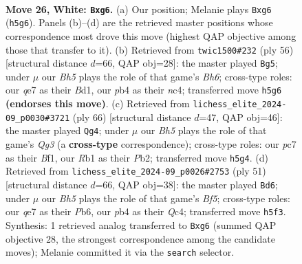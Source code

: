 \documentclass[11pt]{article}
\begin{document}
\clearpage

\begin{figure}[p]\centering
\begin{subfigure}{0.46\textwidth}\centering
\resizebox{\linewidth}{!}{%
\newchessgame
\chessboard[
  setfen={4r1k1/p1ppq2p/5pp1/6nB/1pPP4/P2Q4/2P2P1P/1R4K1 w - - 0 26},
  showmover=false,
  pgfstyle=straightmove, color=movearrow, markmove={h5-g6}
]}
\caption{}
\end{subfigure}\hfill
\begin{subfigure}{0.46\textwidth}\centering
\resizebox{\linewidth}{!}{%
\newchessgame
\chessboard[
  setfen={2rq2k1/5pbp/6pB/p2p4/P1n5/2P3QP/5PP1/3BR1K1 w - - 4 29},
  showmover=false,
  pgfstyle=straightmove, color=movearrow, markmove={h6-g5}
]}
\caption{}
\end{subfigure}
\\[4pt]
\begin{subfigure}{0.46\textwidth}\centering
\resizebox{\linewidth}{!}{%
\newchessgame
\chessboard[
  setfen={1k1r4/p3np2/P1pqp2p/1p4p1/7P/4R1Q1/1PP2PP1/5BK1 w - - 3 34},
  showmover=false,
  pgfstyle=straightmove, color=movearrow, markmove={g3-g4}
]}
\caption{}
\end{subfigure}\hfill
\begin{subfigure}{0.46\textwidth}\centering
\resizebox{\linewidth}{!}{%
\newchessgame
\chessboard[
  setfen={4r1k1/2p2pp1/1p5p/8/p1qP1b2/2P2NPP/P4P2/1R1Q2K1 b - - 0 26},
  showmover=false,
  pgfstyle=straightmove, color=movearrow, markmove={f4-d6}
]}
\caption{}
\end{subfigure}
\caption{\textbf{Move 26, White: \texttt{Bxg6}.} (a) Our position; Melanie plays \texttt{Bxg6} (\texttt{h5g6}). Panels (b)--(d) are the retrieved master positions whose correspondence most drove this move (highest QAP objective among those that transfer to it). (b) Retrieved from \texttt{twic1500\#232} (ply 56) [structural distance $d$=66, QAP obj=28]: the master played \texttt{Bg5}; under $\mu$ our \emph{Bh5} plays the role of that game's \emph{Bh6}; cross-type roles: our \emph{q}e7 as their \emph{B}d1, our \emph{p}b4 as their \emph{n}c4; transferred move \texttt{h5g6} \textbf{(endorses this move)}. (c) Retrieved from \texttt{lichess\_elite\_2024-09\_p0030\#3721} (ply 66) [structural distance $d$=47, QAP obj=46]: the master played \texttt{Qg4}; under $\mu$ our \emph{Bh5} plays the role of that game's \emph{Qg3} (a \textbf{cross-type} correspondence); cross-type roles: our \emph{p}c7 as their \emph{B}f1, our \emph{R}b1 as their \emph{P}b2; transferred move \texttt{h5g4}. (d) Retrieved from \texttt{lichess\_elite\_2024-09\_p0026\#2753} (ply 51) [structural distance $d$=66, QAP obj=38]: the master played \texttt{Bd6}; under $\mu$ our \emph{Bh5} plays the role of that game's \emph{Bf5}; cross-type roles: our \emph{q}e7 as their \emph{P}b6, our \emph{p}b4 as their \emph{Q}c4; transferred move \texttt{h5f3}. Synthesis: 1 retrieved analog transferred to \texttt{Bxg6} (summed QAP objective 28, the strongest correspondence among the candidate moves); Melanie committed it via the \texttt{search} selector.}
\label{fig:thought-m50}
\end{figure}
\end{document}
